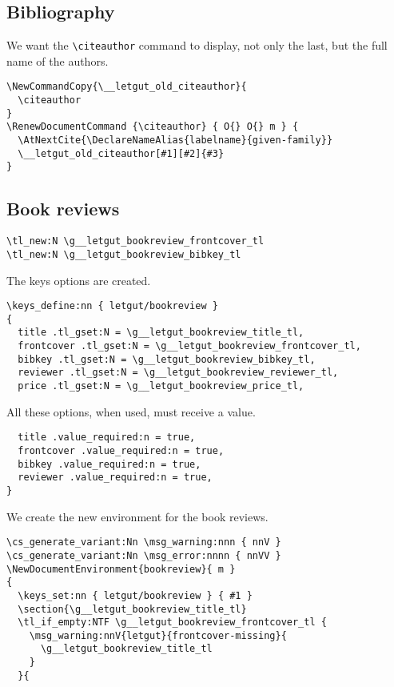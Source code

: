 \documentclass{letgut}
\begin{document}
\subsection{Bibliography}
\label{ImplementationBibliography-ruyg55h0jlj0}
We want the \lstinline+\citeauthor+ command to display, not only the last, but the
full name of the authors.

\begin{lstlisting}
\NewCommandCopy{\__letgut_old_citeauthor}{
  \citeauthor
}
\RenewDocumentCommand {\citeauthor} { O{} O{} m } {
  \AtNextCite{\DeclareNameAlias{labelname}{given-family}}
  \__letgut_old_citeauthor[#1][#2]{#3}
}
\end{lstlisting}

\subsection{Book reviews}
\label{ImplementationBookreviews-ekzg55h0jlj0}
\begin{lstlisting}
\tl_new:N \g__letgut_bookreview_frontcover_tl
\tl_new:N \g__letgut_bookreview_bibkey_tl
\end{lstlisting}
The keys options are created.
\begin{lstlisting}
\keys_define:nn { letgut/bookreview }
{
  title .tl_gset:N = \g__letgut_bookreview_title_tl,
  frontcover .tl_gset:N = \g__letgut_bookreview_frontcover_tl,
  bibkey .tl_gset:N = \g__letgut_bookreview_bibkey_tl,
  reviewer .tl_gset:N = \g__letgut_bookreview_reviewer_tl,
  price .tl_gset:N = \g__letgut_bookreview_price_tl,
\end{lstlisting}

All these options, when used, must receive a value.

\begin{lstlisting}
  title .value_required:n = true,
  frontcover .value_required:n = true,
  bibkey .value_required:n = true,
  reviewer .value_required:n = true,
}
\end{lstlisting}

We create the new environment for the book reviews.

\begin{lstlisting}
\cs_generate_variant:Nn \msg_warning:nnn { nnV }
\cs_generate_variant:Nn \msg_error:nnnn { nnVV }
\NewDocumentEnvironment{bookreview}{ m }
{
  \keys_set:nn { letgut/bookreview } { #1 }
  \section{\g__letgut_bookreview_title_tl}
  \tl_if_empty:NTF \g__letgut_bookreview_frontcover_tl {
    \msg_warning:nnV{letgut}{frontcover-missing}{
      \g__letgut_bookreview_title_tl
    }
  }{
\end{lstlisting}
\end{document}
